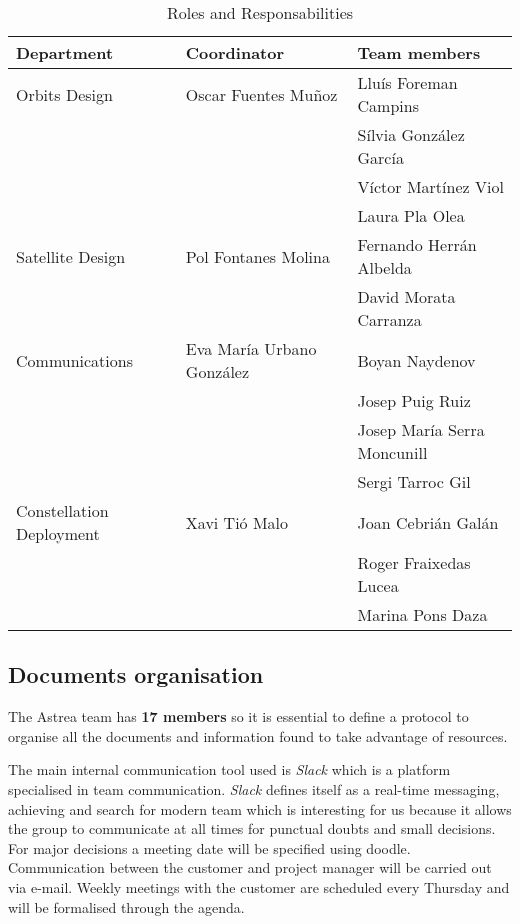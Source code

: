 \begin{table}[h]
\begin{tabular}{ | l | l | p{5cm} |}
\hline
\textbf{Department} & \textbf{Coordinator} & \textbf{Team members} \\ \hline
Orbits Design & Oscar Fuentes Muñoz & Llu\'{i}s Foreman Campins\\ \hline
 & & S\'{i}lvia Gonz\'{a}lez Garc\'{i}a \\ \hline
 & & V\'{i}ctor Mart\'{i}nez Viol \\ \hline
 & & Laura Pla Olea \\ \hline
Satellite Design & Pol Fontanes Molina & Fernando Herr\'{a}n Albelda \\ \hline
 & & David Morata Carranza \\ \hline
Communications & Eva Mar\'{i}a Urbano Gonz\'{a}lez & Boyan Naydenov \\ \hline
 & & Josep Puig Ruiz \\ \hline
 & & Josep Mar\'{i}a Serra Moncunill \\ \hline
 & & Sergi Tarroc Gil \\ \hline
Constellation Deployment & Xavi Ti\'{o} Malo & Joan Cebri\'{a}n Gal\'{a}n \\ \hline
 & & Roger Fraixedas Lucea \\ \hline
 & & Marina Pons Daza \\ \hline

\end{tabular}
\caption{Roles and Responsabilities}
\end{table}
\subsection{Documents organisation}


The Astrea team has \textbf{17 members} so it is essential to define a protocol to organise all the documents and information found to take advantage of resources. 
\newline

The main internal communication tool used is \textit{Slack} which is a platform specialised in team communication. \textit{Slack} defines itself as a real-time messaging, achieving and search for modern team which is interesting for us because it allows the group to communicate at all times for punctual doubts and small decisions. For major decisions a meeting date will be specified using doodle. Communication between the customer and project manager will be carried out via e-mail. Weekly meetings with the customer are scheduled every Thursday and will be formalised through the agenda.
 \newline


